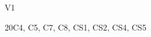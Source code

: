 \begin{syllabus}
\begin{competences}{V1}
    \item {} 
    \item {} 
    \item {}
	\item {}
	\item {}
	\item {}
	\item {}
	\item {}
	\item {}
	\item {}
	\item {}
\end{competences}

\begin{unit}{\SESoftwareConstruction}{}{}{20}{C4, C5, C7, C8, CS1, CS2, CS4, CS5}
	\begin{topics}
		\item \SESoftwareConstructionTopicCoding
		\item \SESoftwareConstructionTopicCodingStandards
		\item \SESoftwareConstructionTopicIntegration
		\item \SESoftwareConstructionTopicDevelopment
		\item \SESoftwareConstructionTopicPotential
	\end{topics}
	\begin{learningoutcomes}
		\item \SESoftwareConstructionLODescribeTechniques[\Assessment]
		\item \SESoftwareConstructionLOBuild[\Assessment]
		\item \SESoftwareConstructionLODescribeSecure[\Assessment]
		\item \SESoftwareConstructionLOSelectAndDefined[\Assessment]
		\item \SESoftwareConstructionLOCompareAndStrategies[\Assessment]
		\item \SESoftwareConstructionLODescribeTheAnalyzing[\Assessment]
		\item \SESoftwareConstructionLODescribeTheAnalyzingChanges[\Assessment]
		\item \SESoftwareConstructionLORewrite[\Assessment]
		\item \SESoftwareConstructionLOWriteAThatNon[\Assessment]
	\end{learningoutcomes}
\end{unit}


\end{syllabus}
